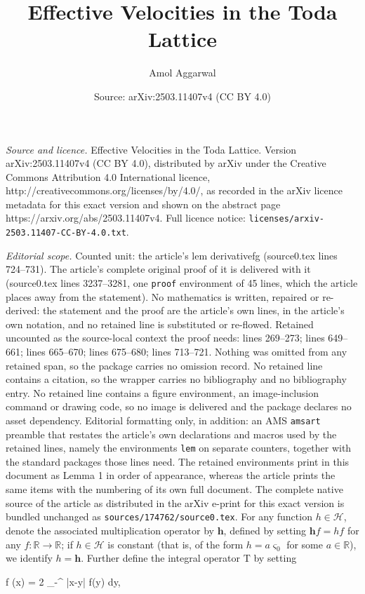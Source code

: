 \documentclass[10pt,a4paper]{amsart}
\title{Effective Velocities in the Toda Lattice}
\author{Amol Aggarwal}
\date{Source: arXiv:2503.11407v4 (CC BY 4.0)}
\begin{document}
\maketitle

\noindent\emph{Source and licence.} Effective Velocities in the Toda Lattice. Version arXiv:2503.11407v4 (CC BY 4.0), distributed by arXiv under the Creative Commons Attribution 4.0 International licence, http://creativecommons.org/licenses/by/4.0/, as recorded in the arXiv licence metadata for this exact version and shown on the abstract page https://arxiv.org/abs/2503.11407v4. Full licence notice: \texttt{licenses/arxiv-2503.11407-CC-BY-4.0.txt}.\par\smallskip

\noindent\textit{Editorial scope.} Counted unit: the article's lem derivativefg (source0.tex lines 724--731). The article's complete original proof of it is delivered with it (source0.tex lines 3237--3281, one \texttt{proof} environment of 45 lines, which the article places away from the statement). No mathematics is written, repaired or re-derived: the statement and the proof are the article's own lines, in the article's own notation, and no retained line is substituted or re-flowed.  Retained uncounted as the source-local context the proof needs: lines 269--273; lines 649--661; lines 665--670; lines 675--680; lines 713--721.  Nothing was omitted from any retained span, so the package carries no omission record.  No retained line contains a citation, so the wrapper carries no bibliography and no bibliography entry.  No retained line contains a figure environment, an image-inclusion command or drawing code, so no image is delivered and the package declares no asset dependency.  Editorial formatting only, in addition: an AMS \texttt{amsart} preamble that restates the article's own declarations and macros used by the retained lines, namely the environments \texttt{lem} on separate counters, together with the standard packages those lines need.  The retained environments print in this document as Lemma 1 in order of appearance, whereas the article prints the same items with the numbering of its own full document.  The complete native source of the article as distributed in the arXiv e-print for this exact version is bundled unchanged as \texttt{sources/174762/source0.tex}.
		\noindent For any function $h \in \mathcal{H}$, denote the associated multiplication operator by $\bm{h}$, defined by setting $\bm{h} f = hf$ for any $f : \mathbb{R} \rightarrow \mathbb{R}$; if $h \in \mathcal{H}$ is constant (that is, of the form $h = a \varsigma_0$ for some $a \in \mathbb{R}$), we identify $h = \bm{h}$. Further define the integral operator $\bm{\mathrm{T}}$ by setting  
		\begin{flalign}
			\label{operatort}
			 f (x) = 2 \displaystyle\int_{-\infty}^{\infty} \log |x-y| f(y) dy,
		\end{flalign}
\end{document}
